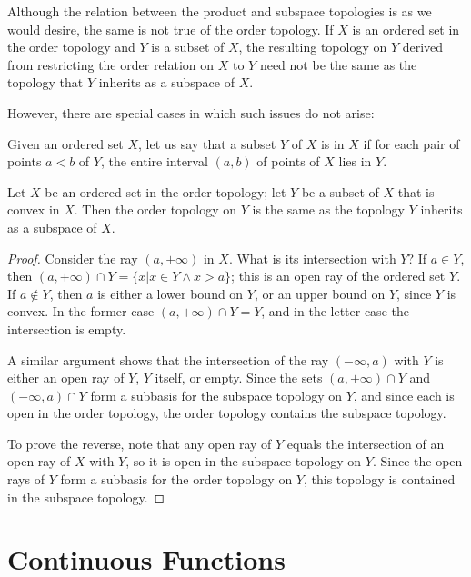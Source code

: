 \documentclass[12pt, a4paper, oneside, openright, titlepage]{book}
\begin{document}
Although the relation between the product and subspace topologies is as we would desire, the same is not true of the order topology. If $X$ is an ordered set in the order topology and $Y$ is a subset of $X$, the resulting topology on $Y$ derived from restricting the order relation on $X$ to $Y$ need not be the same as the topology that $Y$ inherits as a subspace of $X$.

However, there are special cases in which such issues do not arise:

\begin{defn}
    Given an ordered set $X$, let us say that a subset $Y$ of $X$ is  in $X$ if for each pair of points $a < b$ of $Y$, the entire interval $(a,b)$ of points of $X$ lies in $Y$.
\end{defn}

\begin{thm}
    Let $X$ be an ordered set in the order topology; let $Y$ be a subset of $X$ that is convex in $X$. Then the order topology on $Y$ is the same as the topology $Y$ inherits as a subspace of $X$.
\end{thm}
\begin{proof}
    Consider the ray $(a,+\infty)$ in $X$. What is its intersection with $Y$? If $a \in Y$, then $(a,+\infty)\cap Y = \{x\vert x \in Y\wedge x>a\}$; this is an open ray of the ordered set $Y$. If $a \notin Y$, then $a$ is either a lower bound on $Y$, or an upper bound on $Y$, since $Y$ is convex. In the former case $(a,+\infty)\cap Y = Y$, and in the letter case the intersection is empty.

    A similar argument shows that the intersection of the ray $(-\infty,a)$ with $Y$ is either an open ray of $Y$, $Y$ itself, or empty. Since the sets $(a,+\infty)\cap Y$ and $(-\infty,a)\cap Y$ form a subbasis for the subspace topology on $Y$, and since each is open in the order topology, the order topology contains the subspace topology.

    To prove the reverse, note that any open ray of $Y$ equals the intersection of an open ray of $X$ with $Y$, so it is open in the subspace topology on $Y$. Since the open rays of $Y$ form a subbasis for the order topology on $Y$, this topology is contained in the subspace topology.
\end{proof}




\section{Continuous Functions}
\end{document}

